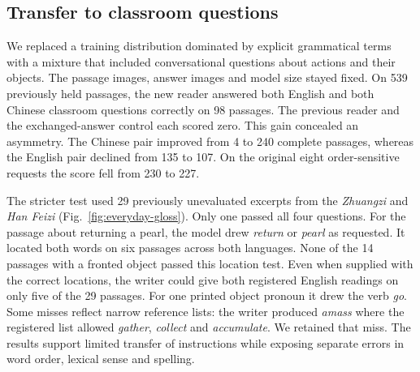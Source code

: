 \subsection*{Transfer to classroom questions}
We replaced a training distribution dominated by explicit grammatical terms with a mixture that included conversational questions about actions and their objects. The passage images, answer images and model size stayed fixed. On 539 previously held passages, the new reader answered both English and both Chinese classroom questions correctly on 98 passages. The previous reader and the exchanged-answer control each scored zero. This gain concealed an asymmetry. The Chinese pair improved from 4 to 240 complete passages, whereas the English pair declined from 135 to 107. On the original eight order-sensitive requests the score fell from 230 to 227.

The stricter test used 29 previously unevaluated excerpts from the \textit{Zhuangzi} and \textit{Han Feizi} (Fig.~\ref{fig:everyday-gloss}). Only one passed all four questions. For the passage about returning a pearl, the model drew \textit{return} or \textit{pearl} as requested. It located both words on six passages across both languages. None of the 14 passages with a fronted object passed this location test. Even when supplied with the correct locations, the writer could give both registered English readings on only five of the 29 passages. For one printed object pronoun it drew the verb \textit{go}. Some misses reflect narrow reference lists: the writer produced \textit{amass} where the registered list allowed \textit{gather}, \textit{collect} and \textit{accumulate}. We retained that miss. The results support limited transfer of instructions while exposing separate errors in word order, lexical sense and spelling.

